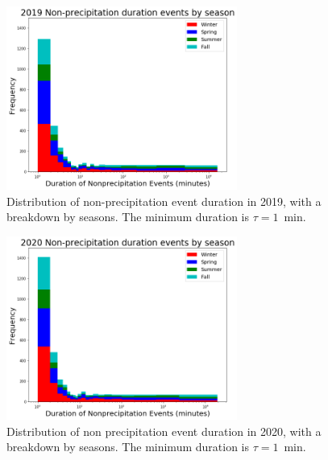 \documentclass[11pt]{report}
\begin{document}
\clearpage
\begin{figure}[t]
	\centering
	\includegraphics[width=0.675\textwidth]{Figures/nonprecip_2019.png}
	\caption[Histogram of non-precipitation events for 2019 broken
	down by season]{\label{np2019} Distribution of
		non-precipitation event duration in 2019, with a breakdown
		by seasons. The minimum duration is $\tau = 1$~min. %
	}
\end{figure}

\begin{figure}[b]
	\centering
	\includegraphics[width=0.675\textwidth]{Figures/nonprecip_2020.png}
	\caption[Histogram of non-precipitation events for 2020 broken down by
	season]{\label{np2020} Distribution of non precipitation event duration
		in 2020, with a breakdown by seasons. The minimum duration is $\tau = 1$~min.}
\end{figure}
\end{document}
